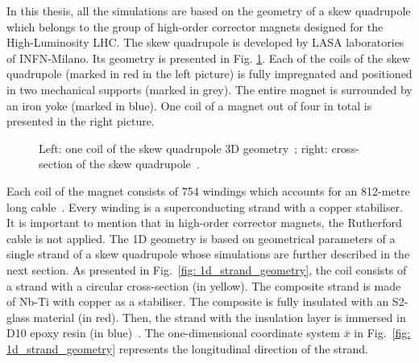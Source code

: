 
In this thesis, all the simulations are based on the geometry of a skew quadrupole which belongs to the group of high-order corrector magnets designed for the High-Luminosity LHC. The skew quadrupole is developed by LASA laboratories of INFN-Milano. Its geometry is presented in Fig. \ref{fig:Skew_quad_geometry}. Each of the coils of the skew quadrupole (marked in red in the left picture) is fully impregnated and positioned in two mechanical supports (marked in grey). The entire magnet is surrounded by an iron yoke (marked in blue). One coil of a magnet out of four in total is presented in the right picture.

\begin{figure}[H]
    \centering
     \caption{Left: one coil of the skew quadrupole 3D geometry~\cite{marco_prioli_mails}; right: cross-section of the skew quadrupole~\cite[p.~103-105]{hl_lhc_tech_design_report_v01}.}
    \label{fig:Skew_quad_geometry}
\end{figure}

Each coil of the magnet consists of 754 windings which accounts for an 812-metre long cable~\cite{samuele_mariotto_mails}. Every winding is a superconducting strand with a copper stabiliser. It is important to mention that in high-order corrector magnets, the Rutherford cable is not applied. The 1D geometry is based on geometrical parameters of a single strand of a skew quadrupole whose simulations are further described in the next section. As presented in Fig.~\ref{fig: 1d_strand_geometry}, the coil consists of a strand with a circular cross-section (in yellow). The composite strand is made of Nb-Ti with copper as a stabiliser. The composite is fully insulated with an S2-glass material (in red). Then, the strand with the insulation layer is immersed in D10 epoxy resin (in blue)~\cite[p.~103-105]{hl_lhc_tech_design_report_v01}. The one-dimensional coordinate system $\bar x$ in Fig.~\ref{fig: 1d_strand_geometry} represents the longitudinal direction of the strand.

